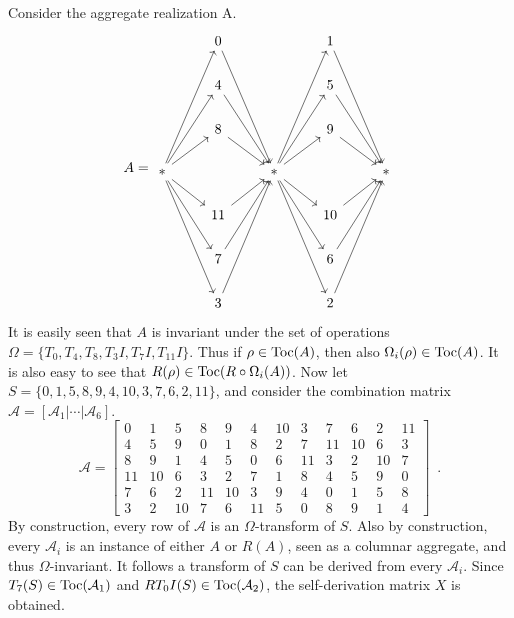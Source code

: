 \begin{example}
    \label{ex:stingray}
    Consider the aggregate realization A.
    \begin{equation}
        A = \begin{tikzcd}
            & 0 \arrow[dddr] && 1 \arrow[dddr] & \\
            & 4 \arrow[ddr] && 5 \arrow[ddr] & \\
            & 8 \arrow[dr] && 9 \arrow[dr] & \\
            * \arrow[ur] \arrow[uur] \arrow[uuur] \arrow[dr] \arrow[ddr] \arrow[dddr] && * \arrow[ur] \arrow[uur] \arrow[uuur] \arrow[dr] \arrow[ddr] \arrow[dddr] && * \\
            & 11 \arrow[ur] && 10 \arrow[ur] & \\
            & 7 \arrow[uur] && 6 \arrow[uur] & \\
            & 3 \arrow[uuur] && 2 \arrow[uuur] &
        \end{tikzcd}
    \end{equation}
    It is easily seen that $A$ is invariant under the set of operations $\Omega = \{ T_0, T_4, T_8, T_3I, T_7I, T_{11}I \}$. Thus if $\rho \in \operatorname{Toc}(A)$, then also $\Omega_i(\rho) \in \operatorname{Toc}(A)$. It is also easy to see that $R(\rho) \in \operatorname{Toc}(R \circ \Omega_i(A))$. Now let $S = \{ 0, 1, 5, 8, 9, 4, 10, 3, 7, 6, 2, 11 \}$, and consider the combination matrix $\mathcal{A} = [\mathcal{A}_1 | \cdots | \mathcal{A}_6]$.
    \begin{equation}
        \mathcal{A} = \left[
        \begin{array}{cc|cc|cc|cc|cc|cc}
            0 & 1 & 5 & 8 & 9 & 4 & 10 & 3 & 7 & 6 & 2 & 11 \\
            4 & 5 & 9 & 0 & 1 & 8 & 2 & 7 & 11 & 10 & 6 & 3 \\
            8 & 9 & 1 & 4 & 5 & 0 & 6 & 11 & 3 & 2 & 10 & 7 \\
            11 & 10 & 6 & 3 & 2 & 7 & 1 & 8 & 4 & 5 & 9 & 0 \\
            7 & 6 & 2 & 11 & 10 & 3 & 9 & 4 & 0 & 1 & 5 & 8 \\
            3 & 2 & 10 & 7 & 6 & 11 & 5 & 0 & 8 & 9 & 1 & 4
        \end{array}
        \right] \enspace.
    \end{equation}
    By construction, every row of $\mathcal{A}$ is an $\Omega$-transform of $S$. Also by construction, every $\mathcal{A}_i$ is an instance of either $A$ or $R(A)$, seen as a columnar aggregate, and thus $\Omega$-invariant. It follows a transform of $S$ can be derived from every $\mathcal{A}_i$. Since $T_7(S) \in \operatorname{Toc}(\mathcal{A}_1)$ and $RT_0I(S) \in \operatorname{Toc}(\mathcal{A}_2)$, the self-derivation matrix $X$ is obtained.

\end{example}

